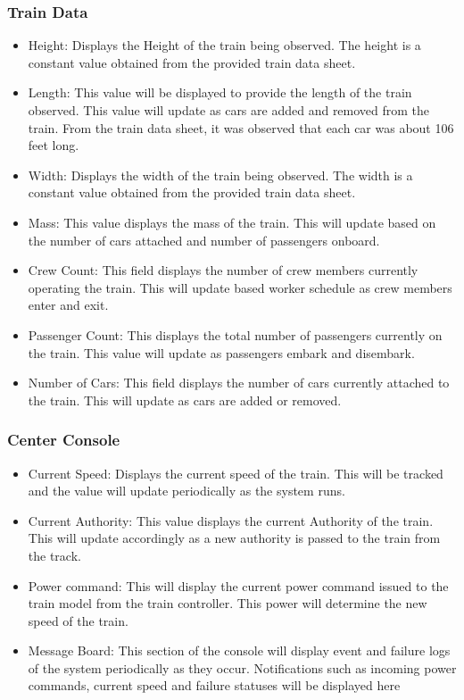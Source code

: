 	\subsubsection{Train Data}
		\begin{itemize}
			\item Height:  Displays the Height of the train being observed. The height is a constant value obtained from the provided train data sheet.
			\item Length: This value will be displayed to provide the length of the train observed. This value will update as cars are added and removed from the train. From the train data sheet, it was observed that each car was about 106 feet long.
			\item Width:  Displays the width of the train being observed. The width is a constant value obtained from the provided train data sheet.
			\item Mass: This value displays the mass of the train. This will update based on the number of cars attached and number of passengers onboard.
			\item Crew Count: This field displays the number of crew members currently operating the train. This will update based worker schedule as crew members enter and exit.
			\item Passenger Count: This displays the total number of passengers currently on the train. This value will update as passengers embark and disembark.
			\item Number of Cars: This field displays the number of cars currently attached to the train. This will update as cars are added or removed. 
		\end{itemize}

	\subsubsection{Center Console}
		\begin{itemize}
			\item Current Speed:  Displays the current speed of the train. This will be tracked and the value will update periodically as the system runs.
			\item Current Authority:  This value displays the current Authority of the train. This will update accordingly as a new authority is passed to the train from the track.
			\item Power command: This will display the current power command issued to the train model from the train controller. This power will determine the new speed of the train.
			\item Message Board: This section of the console will display event and failure logs of the system periodically as they occur. Notifications such as incoming power commands, current speed and failure statuses will be displayed here
		\end{itemize}

